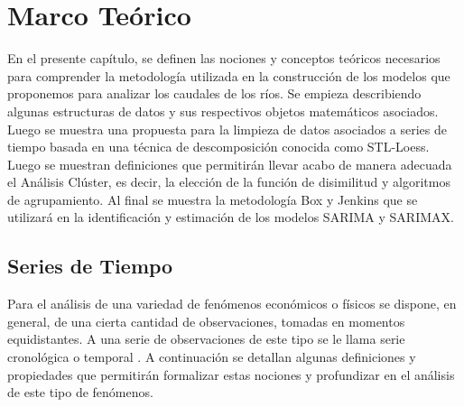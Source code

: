 \documentclass[12pt,oneside]{book}\usepackage[]{graphicx}\usepackage[]{color}
\theoremstyle{definition} %
\begin{document}
\chapter{Marco Teórico}






En el presente capítulo, se definen las nociones y conceptos teóricos necesarios para comprender la metodología utilizada en la construcción de los modelos que proponemos para analizar los caudales de los ríos. Se empieza describiendo algunas estructuras de datos y sus respectivos objetos matemáticos asociados. Luego se muestra una propuesta para la limpieza de datos asociados a series de tiempo basada en una técnica de descomposición conocida como STL-Loess. Luego se muestran definiciones que permitirán llevar acabo de manera adecuada el Análisis Clúster, es decir, la elección de la función de disimilitud y algoritmos de agrupamiento. Al final se muestra la metodología Box y Jenkins que se utilizará en la identificación y estimación de los modelos SARIMA y SARIMAX.


\section{Series de Tiempo}

Para el análisis de una variedad de fenómenos económicos o físicos se dispone, en general, de una cierta cantidad de observaciones, tomadas en momentos equidistantes. A una serie de observaciones de este tipo se le llama serie cronológica o temporal \cite{capa2016seriest}.
A continuación se detallan algunas definiciones y propiedades que permitirán formalizar estas nociones y profundizar en el análisis de este tipo de fenómenos.
\end{document}
